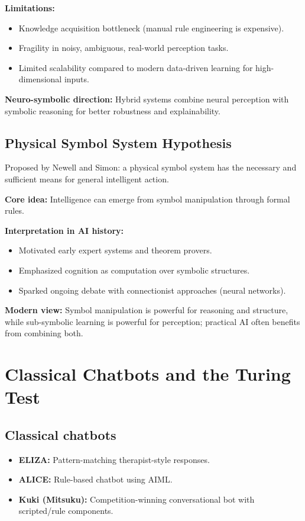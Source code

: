 \documentclass[12pt,a4paper]{article}
\begin{document}
\textbf{Limitations:}
\begin{itemize}[noitemsep]
    \item Knowledge acquisition bottleneck (manual rule engineering is expensive).
    \item Fragility in noisy, ambiguous, real-world perception tasks.
    \item Limited scalability compared to modern data-driven learning for high-dimensional inputs.
\end{itemize}

\textbf{Neuro-symbolic direction:} Hybrid systems combine neural perception with symbolic reasoning for better robustness and explainability.

\subsection*{Physical Symbol System Hypothesis}
Proposed by Newell and Simon: a physical symbol system has the necessary and sufficient means for general intelligent action.

\textbf{Core idea:} Intelligence can emerge from symbol manipulation through formal rules.

\textbf{Interpretation in AI history:}
\begin{itemize}[noitemsep]
    \item Motivated early expert systems and theorem provers.
    \item Emphasized cognition as computation over symbolic structures.
    \item Sparked ongoing debate with connectionist approaches (neural networks).
\end{itemize}

\textbf{Modern view:} Symbol manipulation is powerful for reasoning and structure, while sub-symbolic learning is powerful for perception; practical AI often benefits from combining both.

\section{\textcolor{primary}{Classical Chatbots and the Turing Test}}

\subsection*{Classical chatbots}
\begin{itemize}[noitemsep]
    \item \textbf{ELIZA:} Pattern-matching therapist-style responses.
    \item \textbf{ALICE:} Rule-based chatbot using AIML.
    \item \textbf{Kuki (Mitsuku):} Competition-winning conversational bot with scripted/rule components.
\end{itemize}
\end{document}
